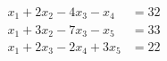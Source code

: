%
\begin{align*}
x_1+2x_2-4x_3-x_4&=32\\
x_1+3x_2-7x_3-x_5&=33\\
x_1+2x_3-2x_4+3x_5&=22\\
\end{align*}
%
